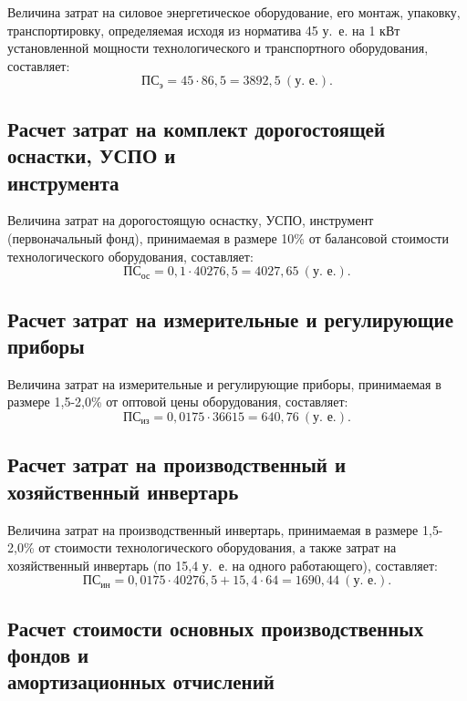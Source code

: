Величина затрат на силовое энергетическое оборудование, его монтаж,
упаковку, транспортировку, определяемая исходя из норматива 45 у.~е.
на 1 кВт установленной мощности технологического и транспортного 
оборудования, составляет:
\begin{equation*}
  \text{ПС}_{\text{э}} = 45 \cdot 86{,}5 = 3892{,}5 \: (\text{у.~е.}).
\end{equation*}

\subsection{
  Расчет затрат на комплект дорогостоящей оснастки, УСПО и \\
  инструмента
}

Величина затрат на дорогостоящую оснастку, УСПО, 
инструмент (первоначальный фонд), принимаемая в размере 10\% от 
балансовой стоимости технологического оборудования, составляет:
\begin{equation*}
  \text{ПС}_{\text{ос}} = 0{,}1 \cdot 40276{,}5 = 4027{,}65 \: (\text{у.~е.}).
\end{equation*}

\subsection{Расчет затрат на измерительные и
  регулирующие приборы}

Величина затрат на измерительные и регулирующие приборы,
принимаемая в размере 1{,}5-2{,}0\% от 
оптовой цены оборудования, составляет:
\begin{equation*}
  \text{ПС}_{\text{из}} = 0{,}0175 \cdot 36615 = 640{,}76 \: (\text{у.~е.}).
\end{equation*}

\subsection{Расчет затрат на производственный и
  хозяйственный инвертарь}

Величина затрат на производственный инвертарь,
принимаемая в размере 1{,}5-2{,}0\% от 
стоимости технологического оборудования, а также 
затрат на хозяйственный инвертарь 
(по 15{,}4 у.~е. на одного работающего), составляет:
\begin{equation*}
  \text{ПС}_{\text{ин}} = 
  0{,}0175 \cdot 40276{,}5 + 15{,}4 \cdot 64 = 1690{,}44 \: (\text{у.~е.}).
\end{equation*}

\subsection{Расчет стоимости основных производственных фондов и \\
амортизационных отчислений}

